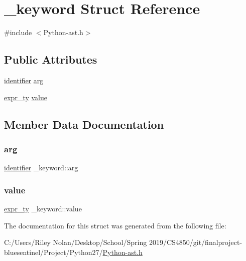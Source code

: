 \hypertarget{struct__keyword}{}\section{\+\_\+keyword Struct Reference}
\label{struct__keyword}


{\ttfamily \#include $<$Python-\/ast.\+h$>$}

\subsection*{Public Attributes}
\begin{DoxyCompactItemize}
\item 
\mbox{\hyperlink{asdl_8h_a78ca2081e230a95abc88c411c9816775}{identifier}} \mbox{\hyperlink{struct__keyword_a07d59cb850aea7fab117dd6ad60f3b21}{arg}}
\item 
\mbox{\hyperlink{_python-ast_8h_a56d3705e020a071405094a220c4592bd}{expr\+\_\+ty}} \mbox{\hyperlink{struct__keyword_a544c297ad30324f7c021dd1b296e770d}{value}}
\end{DoxyCompactItemize}


\subsection{Member Data Documentation}
\mbox{\label{struct__keyword_a07d59cb850aea7fab117dd6ad60f3b21}} 
\subsubsection{\texorpdfstring{arg}{arg}}
{\footnotesize\ttfamily \mbox{\hyperlink{asdl_8h_a78ca2081e230a95abc88c411c9816775}{identifier}} \+\_\+keyword\+::arg}

\mbox{\label{struct__keyword_a544c297ad30324f7c021dd1b296e770d}} 
\subsubsection{\texorpdfstring{value}{value}}
{\footnotesize\ttfamily \mbox{\hyperlink{_python-ast_8h_a56d3705e020a071405094a220c4592bd}{expr\+\_\+ty}} \+\_\+keyword\+::value}



The documentation for this struct was generated from the following file\+:\begin{DoxyCompactItemize}
\item 
C\+:/\+Users/\+Riley Nolan/\+Desktop/\+School/\+Spring 2019/\+C\+S4850/git/finalproject-\/bluesentinel/\+Project/\+Python27/\mbox{\hyperlink{_python-ast_8h}{Python-\/ast.\+h}}\end{DoxyCompactItemize}
